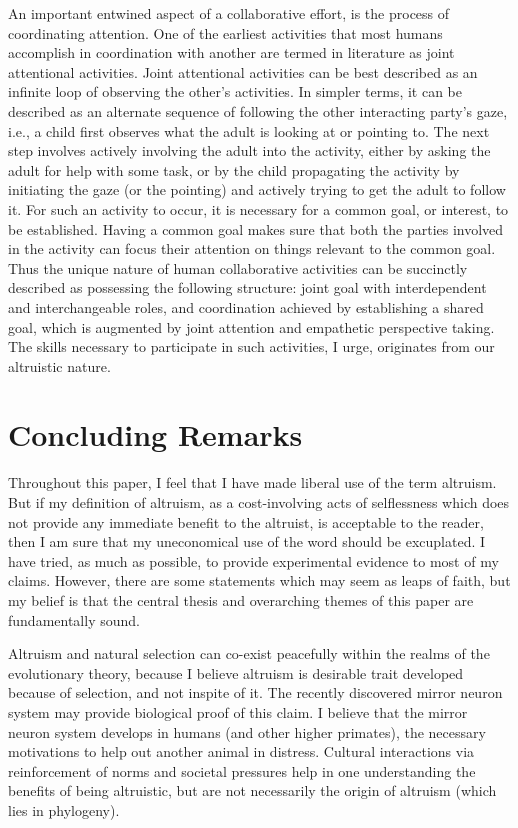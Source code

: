\documentclass[12pt, letter]{article}
\begin{document}
An important entwined aspect of a collaborative effort, is the process of coordinating attention. One of the earliest activities that most humans accomplish in coordination with another are termed in literature as joint attentional activities. Joint attentional activities can be best described as an infinite loop of observing the other's activities. In simpler terms, it can be described as an alternate sequence of following the other interacting party's gaze, i.e., a child first observes what the adult is looking at or pointing to. The next step involves actively involving the adult into the activity, either by asking the adult for help with some task, or by the child propagating the activity by initiating the gaze (or the pointing) and actively trying to get the adult to follow it. For such an activity to occur, it is necessary for a common goal, or interest, to be established. Having a common goal makes sure that both the parties involved in the activity can focus their attention on things relevant to the common goal. Thus the unique nature of human collaborative activities can be succinctly described as possessing the following structure: joint goal with interdependent and interchangeable roles, and coordination achieved by establishing a shared goal, which is augmented by joint attention and empathetic perspective taking. The skills necessary to participate in such activities, I urge, originates from our altruistic nature.

\section*{Concluding Remarks}

Throughout this paper, I feel that I have made liberal use of the term altruism. But if my definition of altruism, as a cost-involving acts of selflessness which does not provide any immediate benefit to the altruist, is acceptable to the reader, then I am sure that my uneconomical use of the word should be excuplated. I have tried, as much as possible, to provide experimental evidence to most of my claims. However, there are some statements which may seem as leaps of faith, but my belief is that the central thesis and overarching themes of this paper are fundamentally sound.

Altruism and natural selection can co-exist peacefully within the realms of the evolutionary theory, because I believe altruism is desirable trait developed because of selection, and not inspite of it. The recently discovered mirror neuron system may provide biological proof of this claim. I believe that the mirror neuron system develops in humans (and other higher primates), the necessary motivations to help out another animal in distress.  Cultural interactions via reinforcement of norms and societal pressures help in one understanding the benefits of being altruistic, but are not necessarily the origin of altruism (which lies in phylogeny).
\end{document}
